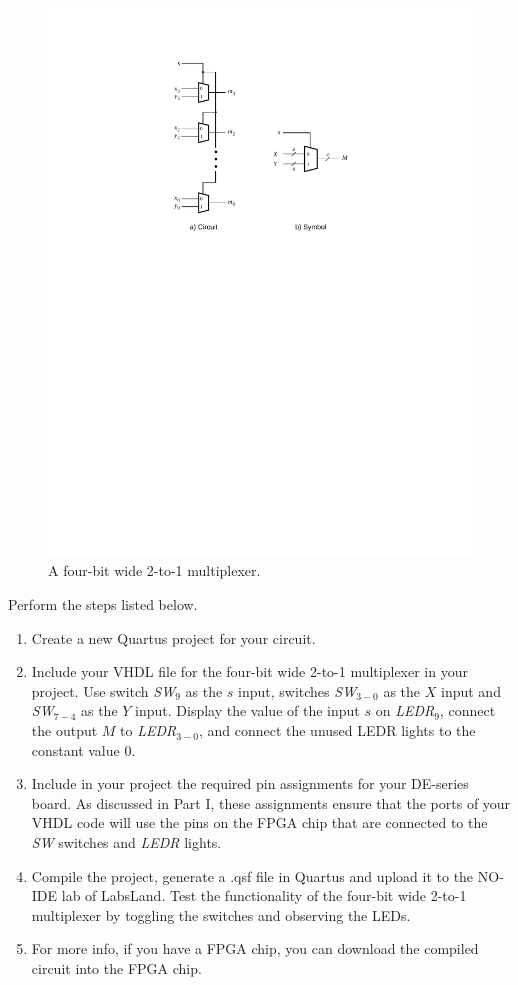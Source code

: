 \documentclass[epsfig,10pt,fullpage]{article}
\begin{document}
\begin{figure}[htb]
	\begin{center}
		\includegraphics[scale=.8]{figures/figure3.pdf}
	\end{center}
\caption{A four-bit wide 2-to-1 multiplexer.}
\label{fig:3}
\end{figure}

Perform the steps listed below.
\begin{enumerate}
\item Create a new Quartus  project for your circuit.
\item Include your VHDL file for the four-bit wide 2-to-1 multiplexer 
in your project. Use switch {\it SW}$_{9}$ as the $s$ input, switches
{\it SW}$_{3-0}$ as the $X$ input and 
{\it SW}$_{7-4}$ as the $Y$ input. Display the value of the input $s$ on {\it LEDR}$_9$,
connect the output $M$ to {\it LEDR}$_{3-0}$, and connect the unused LEDR lights to the constant value 0.
\item Include in your project the required pin assignments for your DE-series board. As discussed
in Part I, these assignments ensure that the ports of your VHDL code will use the pins 
on the FPGA chip that are connected to the {\it SW} switches and {\it LEDR} lights. 
\item Compile the project, generate a .qsf file in Quartus and upload it to the NO-IDE lab of LabsLand.
Test the functionality of the 
four-bit wide 2-to-1 multiplexer by toggling the switches and observing the LEDs.
\item For more info, if you have a FPGA chip, you can download the compiled circuit into the FPGA chip.
\end{enumerate}
\end{document}
